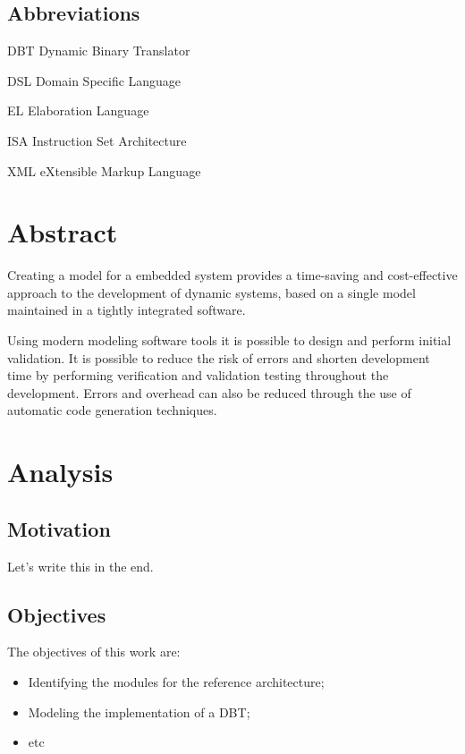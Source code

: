 \documentclass{report}
\newenvironment{abbreviations}{\begin{list}{}{\renewcommand{\makelabel}{\abbrlabel}}}{\end{list}}
\newcommand{\abbrlabel}[1]{\makebox[3cm][l]{\textbf{#1}\ \dotfill}}
\begin{document}
\section*{Abbreviations}
\begin{abbreviations} 
	\item[DBT] Dynamic Binary Translator
	\item[DSL] Domain Specific Language
	\item[EL] Elaboration Language
	\item[ISA] Instruction Set Architecture
	\item[XML] eXtensible Markup Language
\end{abbreviations}
\newpage
\chapter{Abstract}

\par Creating a model for a embedded system provides a time-saving and cost-effective approach to the development of dynamic systems, based on a single model maintained in a tightly integrated software. 
\par Using modern modeling software tools it is possible to design and perform initial validation. It is possible to reduce the risk of errors and shorten development time by performing verification and validation testing throughout the development. Errors and overhead can also be reduced through the use of automatic code generation techniques\cite{modelling-embsys}.
\chapter{Analysis}

	\section{Motivation}
	
	\par Let's write this in the end.

	\section{Objectives}
	
	\par The objectives of this work are:
	\begin{itemize}
		\item Identifying the modules for the reference architecture;
		\item Modeling the implementation of a DBT;
		\item etc
	\end{itemize}
\end{document}
